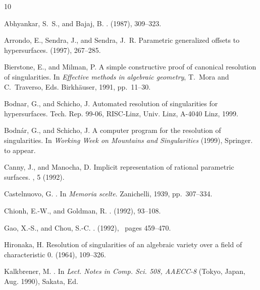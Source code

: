 \begin{thebibliography}{10}

{\sc Abhyankar, S.~S., and Bajaj, B.}
.
 (1987), 309--323.

{\sc Arrondo, E., Sendra, J., and Sendra, J.~R.}
\newblock Parametric generalized offsets to hypersurfaces.
 (1997), 267--285.

{\sc Bierstone, E., and Milman, P.}
\newblock A simple constructive proof of canonical resolution of singularities.
\newblock In {\em Effective methods in algebraic geometry}, T.~Mora and
  C.~Traverso, Eds. {Birkh\"{a}user}, 1991, pp.~11--30.

{\sc Bodnar, G., and Schicho, J.}
\newblock Automated resolution of singularities for hypersurfaces.
\newblock Tech. Rep. 99-06, RISC-Linz, Univ. Linz, A-4040 Linz, 1999.

{\sc Bodn\'{a}r, G., and Schicho, J.}
\newblock A computer program for the resolution of singularities.
\newblock In {\em Working Week on Mountains and Singularities\/} (1999),
  Springer.
\newblock to appear.

{\sc Canny, J., and Manocha, D.}
\newblock Implicit representation of rational parametric surfaces.
, 5 (1992).

{\sc Castelnuovo, G.}
.
\newblock In {\em {Memoria scelte}}. Zanichelli, 1939, pp.~307--334.

{\sc Chionh, E.-W., and Goldman, R.}
.
 (1992), 93--108.

{\sc Gao, X.-S., and Chou, S.-C.}
.
 (1992), \ pages 459--470.

{\sc Hironaka, H.}
\newblock Resolution of singularities of an algebraic variety over a field of
  characteristic 0.
 (1964), 109--326.

{\sc Kalkbrener, M.}
.
\newblock In {\em Lect. Notes in Comp. Sci. 508, AAECC-8\/} (Tokyo, Japan, Aug.
  1990), Sakata, Ed.


\end{thebibliography}
